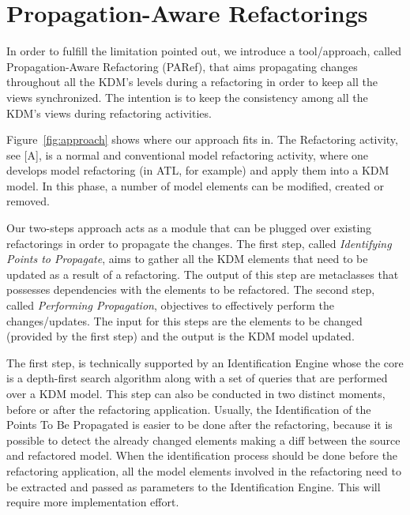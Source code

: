 %
\section{Propagation-Aware Refactorings} %
\label{sec:the_approach}

In order to fulfill the limitation pointed out, we introduce a tool/approach, called Propagation-Aware Refactoring (PARef),  that aims propagating changes throughout all the KDM's levels during a refactoring in order to keep all the views synchronized. The intention is to keep the consistency among all the KDM's views during refactoring activities.

Figure~\ref{fig:approach} shows where our approach fits in. The Refactoring activity, see [A], is a normal and conventional model refactoring activity, where one develops model refactoring (in ATL, for example) and apply them into a KDM model. In this phase, a number of model elements can be modified, created or removed.

Our two-steps approach acts as a module that can be plugged over existing refactorings in order to propagate the changes. The first step, called \textit{Identifying Points to Propagate}, aims to gather all the KDM elements that need to be updated as a result of a refactoring. The output of this step are metaclasses that possesses dependencies with the elements to be refactored. The second step, called \textit{Performing Propagation}, objectives to effectively perform the changes/updates. The input for this steps are the elements to be changed (provided by the first step) and the output is the KDM model updated. 

The first step, is technically supported by an Identification Engine whose the core is a depth-first search algorithm along with a set of queries that are performed over a KDM model. This step can also be conducted in two distinct moments, before or after the refactoring application. Usually, the Identification of the Points To Be Propagated is easier to be done after the refactoring, because it is possible to detect the already changed elements making a diff between the source and refactored model. When the identification process should be done before the refactoring application, all the model elements involved in the refactoring need to be extracted and passed as parameters to the Identification Engine. This will require more implementation effort.


